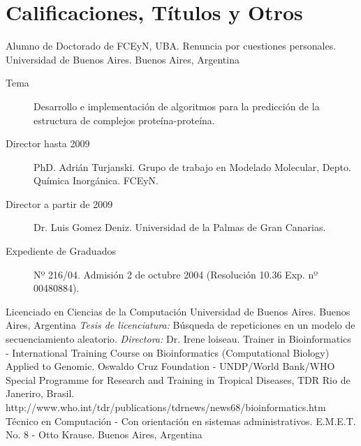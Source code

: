 \section{Calificaciones, Títulos y Otros}

	{Alumno de Doctorado de FCEyN, UBA. Renuncia por cuestiones personales.}
	{Universidad de Buenos Aires.}
	{Buenos Aires, Argentina}
	{}
	{\begin{description}
	\item [Tema] Desarrollo e implementación de algoritmos para la predicción de la estructura de complejos proteína-proteína.
	\item [Director hasta 2009] PhD. Adrián Turjanski. Grupo de trabajo en Modelado Molecular, Depto. Química Inorgánica. FCEyN.	
	\item [Director a partir de 2009] Dr. Luis Gomez Deniz. Universidad de la Palmas de Gran Canarias.
	\item [Expediente de Graduados] Nº 216/04. Admisión 2 de octubre 2004 (Resolución 10.36	Exp. nº 00480884).
	\end{description}}
	{Licenciado en Ciencias de la Computación}
	{Universidad de Buenos Aires.}
	{Buenos Aires, Argentina}
	{}
	{\emph{Tesis de licenciatura:} Búsqueda de repeticiones en un
	modelo de secuenciamiento aleatorio. \emph{Directora:} Dr. Irene loiseau.}
	{Trainer in Bioinformatics - International Training Course on Bioinformatics (Computational Biology) Applied to Genomic.}
	{Oswaldo Cruz Foundation - UNDP/World Bank/WHO Special Programme for Research and Training in Tropical Diseases, TDR}
	{Rio de Janeriro, Brasil.}
	{}
	{http://www.who.int/tdr/publications/tdrnews/news68/bioinformatics.htm}
	{Técnico en Computación - Con orientación en sistemas administrativos.}
	{E.M.E.T. No. 8 - Otto Krause.}
	{Buenos Aires, Argentina}
	{}
	{}


